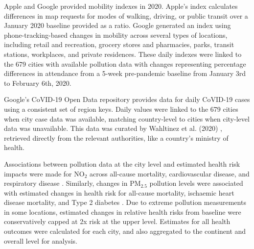 \documentclass[preprint,12pt]{elsarticle}
\begin{document}
Apple\cite{Apple2020} and Google\cite{Google2020} provided mobility indexes in 2020. Apple's index calculates differences in map requests for modes of walking, driving, or public transit over a January 2020 baseline provided as a ratio. Google generated an index using phone-tracking-based changes in mobility across several types of locations, including retail and recreation, grocery stores and pharmacies, parks, transit stations, workplaces, and private residences. These daily indexes were linked to the 679 cities with available pollution data with changes representing percentage differences in attendance from a 5-week pre-pandemic baseline from January 3rd to February 6th, 2020\cite{owidcoronavirus}.

Google's CoVID-19 Open Data repository\cite{Google2022} provides data for daily CoVID-19 cases using a consistent set of region keys. Daily values were linked to the 679 cities when city case data was available, matching country-level to cities when city-level data was unavailable. This data was curated by Wahltinez et al. (2020) \citep{Wahltinez2020}, retrieved directly from the relevant authorities, like a country's ministry of health.

Associations between pollution data at the city level and estimated health risk impacts were made for NO$_{2}$ across all-cause mortality, cardiovascular disease, and respiratory disease \cite{Huang19Pollution}. Similarly, changes in PM$_{2.5}$ pollution levels were associated with estimated changes in health risk for all-cause mortality, ischaemic heart disease mortality, and Type 2 diabetes \cite{Xie257, Yu2020PM2.5}. Due to extreme pollution measurements in some locations, estimated changes in relative health risks from baseline were conservatively capped at 2x risk at the upper level. Estimates for all health outcomes were calculated for each city, and also aggregated to the continent and overall level for analysis. 
\end{document}
